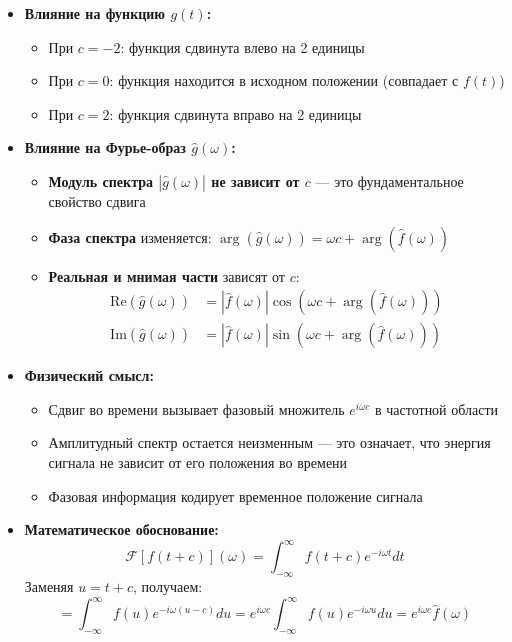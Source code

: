 \begin{itemize}
    \item \textbf{Влияние на функцию $g(t)$:}
    \begin{itemize}
        \item При $c = -2$: функция сдвинута влево на 2 единицы
        \item При $c = 0$: функция находится в исходном положении (совпадает с $f(t)$)
        \item При $c = 2$: функция сдвинута вправо на 2 единицы
    \end{itemize}
    
    \item \textbf{Влияние на Фурье-образ $\hat{g}(\omega)$:}
    \begin{itemize}
        \item \textbf{Модуль спектра $|\hat{g}(\omega)|$ не зависит от $c$} — это фундаментальное свойство сдвига
        \item \textbf{Фаза спектра} изменяется: $\arg(\hat{g}(\omega)) = \omega c + \arg(\hat{f}(\omega))$
        \item \textbf{Реальная и мнимая части} зависят от $c$:
        \begin{align*}
            \text{Re}(\hat{g}(\omega)) &= |\hat{f}(\omega)| \cos(\omega c + \arg(\hat{f}(\omega))) \\
            \text{Im}(\hat{g}(\omega)) &= |\hat{f}(\omega)| \sin(\omega c + \arg(\hat{f}(\omega)))
        \end{align*}
    \end{itemize}
    
    \item \textbf{Физический смысл:}
    \begin{itemize}
        \item Сдвиг во времени вызывает фазовый множитель $e^{i \omega c}$ в частотной области
        \item Амплитудный спектр остается неизменным — это означает, что энергия сигнала не зависит от его положения во времени
        \item Фазовая информация кодирует временное положение сигнала
    \end{itemize}
    
    \item \textbf{Математическое обоснование:}
    \[
    \mathcal{F}[f(t + c)](\omega) = \int_{-\infty}^{\infty} f(t + c) e^{-i \omega t} dt
    \]
    Заменяя $u = t + c$, получаем:
    \[
    = \int_{-\infty}^{\infty} f(u) e^{-i \omega (u - c)} du = e^{i \omega c} \int_{-\infty}^{\infty} f(u) e^{-i \omega u} du = e^{i \omega c} \hat{f}(\omega)
    \]
\end{itemize}


